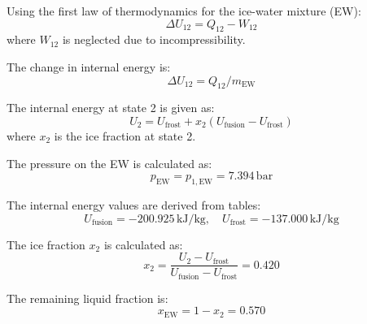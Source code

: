 Using the first law of thermodynamics for the ice-water mixture (EW):  
\[
\Delta U_{12} = Q_{12} - W_{12}
\]  
where \( W_{12} \) is neglected due to incompressibility.  

The change in internal energy is:  
\[
\Delta U_{12} = Q_{12} / m_{\text{EW}}
\]  

The internal energy at state 2 is given as:  
\[
U_2 = U_{\text{frost}} + x_2 (U_{\text{fusion}} - U_{\text{frost}})
\]  
where \( x_2 \) is the ice fraction at state 2.  

The pressure on the EW is calculated as:  
\[
p_{\text{EW}} = p_{1,\text{EW}} = 7.394 \, \text{bar}
\]  

The internal energy values are derived from tables:  
\[
U_{\text{fusion}} = -200.925 \, \text{kJ/kg}, \quad U_{\text{frost}} = -137.000 \, \text{kJ/kg}
\]  

The ice fraction \( x_2 \) is calculated as:  
\[
x_2 = \frac{U_2 - U_{\text{frost}}}{U_{\text{fusion}} - U_{\text{frost}}} = 0.420
\]  

The remaining liquid fraction is:  
\[
x_{\text{EW}} = 1 - x_2 = 0.570
\]